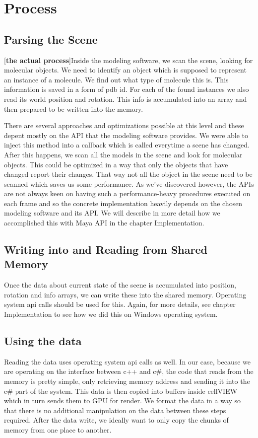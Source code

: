 \documentclass[
  digital, %
  table,   %
  nolof,     %
  nolot,     %
]{fithesis3}
\begin{document}
\section{Process}
\subsection{Parsing the Scene}
[\textbf{the actual process}]Inside the modeling software, we scan the scene, looking for molecular objects. We need to identify an object which is supposed to represent an instance of a molecule. We find out what type of molecule this is. This information is saved in a form of pdb id. For each of the found instances we also read its world position and rotation. This info is accumulated into an array and then prepared to be written into the memory.

There are several approaches and optimizations possible at this level and these depent mostly on the API that the modeling software provides. We were able to inject this method into a callback which is called everytime a scene has changed. After this happens, we scan all the models in the scene and look for molecular objects. This could be optimized in a way that only the objects that have changed report their changes. That way not all the object in the scene need to be scanned which saves us some performance. As we've discovered however, the APIs are not always keen on having such a performance-heavy procedures executed on each frame and so the concrete implementation heavily depends on the chosen modeling software and its API. We will describe in more detail how we accomplished this with Maya API in the chapter Implementation.

\subsection{Writing into and Reading from Shared Memory}
Once the data about current state of the scene is accumulated into position, rotation and info arrays, we can write these into the shared memory. Operating system api calls should be used for this. Again, for more details, see chapter Implementation to see how we did this on Windows operating system.

\subsection{Using the data}
Reading the data uses operating system api calls as well. In our case, because we are operating on the interface between c++ and c\#, the code that reads from the memory is pretty simple, only retrieving memory address and sending it into the c\# part of the system. This data is then copied into buffers inside cellVIEW which in turn sends them to GPU for render. We format the data in a way so that there is no additional manipulation on the data between these steps required. After the data write, we ideally want to only copy the chunks of memory from one place to another.
\end{document}
